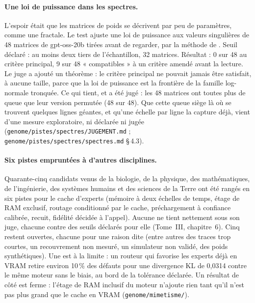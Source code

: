 \documentclass[11pt, a4paper]{article}
\theoremstyle{remark}
\newcommand{\fichier}[1]{\textsf{\footnotesize\nolinkurl{#1}}}
\begin{document}
\paragraph{Une loi de puissance dans les spectres.} L'espoir était que les matrices de poids se décrivent par peu de paramètres, comme une fractale. Le test ajuste une loi de puissance aux valeurs singulières de 48 matrices de gpt-oss-20b tirées avant de regarder, par la méthode de \citet{clauset2009power}. Seuil déclaré : au moins deux tiers de l'échantillon, 32 matrices. Résultat : 0 sur 48 au critère principal, 9 sur 48 « compatibles » à un critère amendé avant la lecture. Le juge a ajouté un théorème : le critère principal ne pouvait jamais être satisfait, à aucune taille, parce que la loi de puissance est la frontière de la famille log-normale tronquée. Ce qui tient, et a été jugé : les 48 matrices ont toutes plus de queue que leur version permutée (48 sur 48). Que cette queue siège là où se trouvent quelques lignes géantes, et qu'une échelle par ligne la capture déjà, vient d'une mesure exploratoire, ni déclarée ni jugée (\fichier{genome/pistes/spectres/JUGEMENT.md} ; \fichier{genome/pistes/spectres/spectres.md} §\,4.3).

\paragraph{Six pistes empruntées à d'autres disciplines.} Quarante-cinq candidats venus de la biologie, de la physique, des mathématiques, de l'ingénierie, des systèmes humains et des sciences de la Terre ont été rangés en six pistes pour le cache d'experts (mémoire à deux échelles de temps, étage de RAM exclusif, routage conditionné par le cache, préchargement à confiance calibrée, recuit, fidélité décidée à l'appel). Aucune ne tient nettement sous son juge, chacune contre des seuils déclarés pour elle (Tome~III, chapitre~6). Cinq restent ouvertes, chacune pour une raison dite (entre autres des traces trop courtes, un recouvrement non mesuré, un simulateur non validé, des poids synthétiques). Une est à la limite : un routeur qui favorise les experts déjà en VRAM retire environ 10\,\% des défauts pour une divergence KL de 0,0314 contre le même moteur sans le biais, au bord de la tolérance déclarée. Un résultat de côté est ferme : l'étage de RAM inclusif du moteur n'ajoute rien tant qu'il n'est pas plus grand que le cache en VRAM (\fichier{genome/mimetisme/}).
\end{document}
